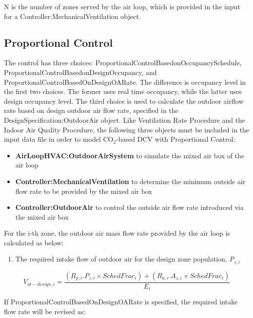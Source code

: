N is the number of zones served by the air loop, which is provided in the input for a Controller:MechanicalVentilation object.

\subsection{Proportional Control}\label{proportional-control}

The control has three choices: ProportionalControlBasedonOccupancySchedule,  ProportionalControlBasedonDesignOccupancy, and ProportionalControlBasedOnDesignOARate. The difference is occupancy level in the first two choices. The former uses real time occupancy, while the latter uses design occupancy level. The third choice is used to calculate the outdoor airflow rate based on design outdoor air flow rate, specified in the DesignSpecification:OutdoorAir object. Like Ventilation Rate Procedure and the Indoor Air Quality Procedure, the following three objects must be included in the input data file in order to model CO\(_{2}\)-based DCV with Proportional Control:

\begin{itemize}
  \item \textbf{AirLoopHVAC:OutdoorAirSystem} to simulate the mixed air box of the air loop
  \item \textbf{Controller:MechanicalVentilation} to determine the minimum outside air flow rate to be provided by the mixed air box
  \item \textbf{Controller:OutdoorAir} to control the outside air flow rate introduced via the mixed air box
\end{itemize}

For the i-th zone, the outdoor air mass flow rate provided by the air loop is calculated as below:

\begin{enumerate}
\item The required intake flow of outdoor air for the design zone population, \emph{P\(_{z,i}\)}
\end{enumerate}


\begin{equation}
{V_{ot - design,i}} = \frac{{\left( {{R_{p,i}}.{P_{z,i}} \times {SchedFrac_i}} \right) + ({R_{a,i}}.{A_{z,i}} \times {SchedFrac_i})}}{{{E_i}}}
\end{equation}

If ProportionalControlBasedOnDesignOARate is specified, the required intake flow rate will be revised as:

